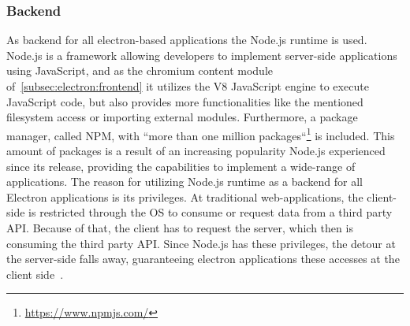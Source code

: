\subsubsection{Backend}
\label{subsec:electron:backend}
As backend for all electron-based applications the Node.js runtime is used.
Node.js is a framework allowing developers to implement server-side applications using JavaScript, and as the chromium content module of~\ref{subsec:electron:frontend} it utilizes the V8 JavaScript engine to execute JavaScript code, but also provides more functionalities like the mentioned filesystem access
or importing external modules.
Furthermore, a package manager, called \ac{NPM}, with ``more than one million packages``\footnote{\url{https://www.npmjs.com/}} is included.
This amount of packages is a result of an increasing popularity Node.js experienced since its release, providing the capabilities to implement a wide-range of applications.
The reason for utilizing Node.js runtime as a backend for all Electron applications is its privileges.
At traditional web-applications, the client-side is restricted through the OS to consume or request data from a third party \ac{API}\@.
Because of that, the client has to request the server, which then is consuming the third party \ac{API}\@.
Since Node.js has these privileges, the detour at the server-side falls away, guaranteeing electron applications these accesses at the client side~\cite{electron-in-action, electron-nwjs}.


